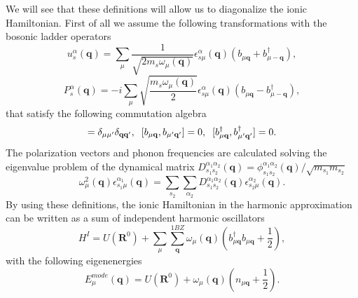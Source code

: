 We will see that these definitions will allow us to diagonalize the ionic Hamiltonian. First of all we assume the following transformations with the bosonic ladder operators
\begin{equation}
 \label{displacement-quantization}
 u_{s}^{\alpha}(\mathbf{q})=\sum_{\mu}\frac{1}{\sqrt{2m_{s}\omega_{\mu}(\mathbf{q})}}\epsilon_{s\mu}^{\alpha}(\mathbf{q})(b_{\mu\mathbf{q}}+b_{\mu-\mathbf{q}}^{\dagger}),
\end{equation}
\begin{equation}
 \label{momentum-quantization}
 P_{s}^{\alpha}(\mathbf{q})=-i\sum_{\mu}\sqrt{\frac{m_{s}\omega_{\mu}(\mathbf{q})}{2}}\epsilon_{s\mu}^{\alpha}(\mathbf{q})(b_{\mu\mathbf{q}}-b_{\mu-\mathbf{q}}^{\dagger}),
\end{equation}
that satisfy the following commutation algebra
\begin{equation}
 [b_{\mu\mathbf{q}},b^{\dagger}_{\mu'\mathbf{q}'}]=\delta_{\mu\mu'}\delta_{\mathbf{q}\mathbf{q}'}, \hspace{0.2cm} [b_{\mu\mathbf{q}},b_{\mu'\mathbf{q}'}]=0, \hspace{0.2cm} 
 [b^{\dagger}_{\mu\mathbf{q}},b^{\dagger}_{\mu'\mathbf{q}'}]=0.
\end{equation}
The polarization vectors and phonon frequencies are calculated solving the eigenvalue problem of the dynamical matrix $D_{s_{1}s_{2}}^{\alpha_{1}\alpha_{2}}(\mathbf{q})=\phi_{s_{1}s_{2}}^{\alpha_{1}\alpha_{
2}}(\mathbf{q})/\sqrt{m_{s_{1}}m_{s_{2}}}$
\begin{equation}
 \omega_{\mu}^{2}(\mathbf{q})\epsilon_{s_{1}\mu}^{\alpha_{1}}(\mathbf{q})=\sum_{s_{2}}\sum_{\alpha_{2}}D_{s_{1}s_{2}}^{\alpha_{1}\alpha_{2}}(\mathbf{q})\epsilon_{s_{2}\mu}^{\alpha_{2}}(\mathbf{q}).
\end{equation}
By using these definitions, the ionic Hamiltonian in the harmonic approximation can be written as a sum of independent harmonic oscillators\cite{ashcroft1976solid,mahan2013many,born1954dynamical}
\begin{equation}
 \label{diagonal-ionic-hamiltonian}
 H^{I}=U(\mathbf{R}^{0})+\sum_{\mu}\sum_{\mathbf{q}}^{1BZ}\omega_{\mu}(\mathbf{q})\left(b_{\mu\mathbf{q}}^{\dagger}b_{\mu\mathbf{q}}+\frac{1}{2}\right),
\end{equation}
with the following eigenenergies
\begin{equation}
 \label{ionic-eigenvalues}
 E^{mode}_{\mu}(\mathbf{q})=U(\mathbf{R}^{0})+\omega_{\mu}(\mathbf{q})\left(n_{\mu\mathbf{q}}+\frac{1}{2}\right).
\end{equation}
